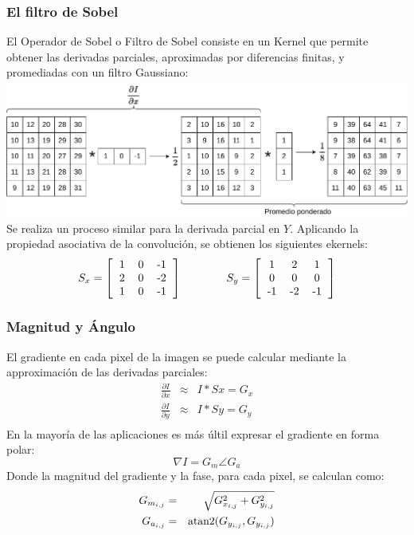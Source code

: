\begin{frame}\frametitle{El filtro de Sobel}
  El Operador de Sobel o Filtro de Sobel consiste en un Kernel que permite obtener las derivadas parciales, aproximadas por diferencias finitas, y promediadas con un filtro Gaussiano:
  \includegraphics[width=\textwidth]{Figuras/SobelX1.pdf}
  Se realiza un proceso similar para la derivada parcial en $Y$. Aplicando la propiedad asociativa de la convolución, se obtienen los siguientes ekernels:
  \[S_x = \left[\begin{tabular}{ccc}1 & 0 & -1\\2 & 0 & -2\\1 & 0 & -1 \end{tabular}\right]\qquad\qquad
  S_y = \left[\begin{tabular}{ccc}1 & 2 & 1\\0 & 0 & 0\\-1 & -2 & -1 \end{tabular}\right]\]
\end{frame}

\begin{frame}\frametitle{Magnitud y Ángulo}
  El gradiente en cada pixel de la imagen se puede calcular mediante la approximación de las derivadas parciales:
  \begin{eqnarray*}
    \frac{\partial I}{\partial x} &\approx& I * Sx = G_x\\
    \frac{\partial I}{\partial y} &\approx& I * Sy = G_y\\
  \end{eqnarray*}
  En la mayoría de las aplicaciones es más últil expresar el gradiente en forma polar:
  \[ \nabla I = G_m \angle G_a \]
  Donde la magnitud del gradiente y la fase, para cada pixel, se calculan como:
  \begin{eqnarray*}
    G_{m_{i,j}} &=& \sqrt{G_{x_{i,j}}^2 + G_{y_{i,j}}^2}\\
    G_{a_{i,j}} &=& \operatorname{atan2}(G_{y_{i,j}}, G_{y_{i,j}})\\
  \end{eqnarray*}
\end{frame}

